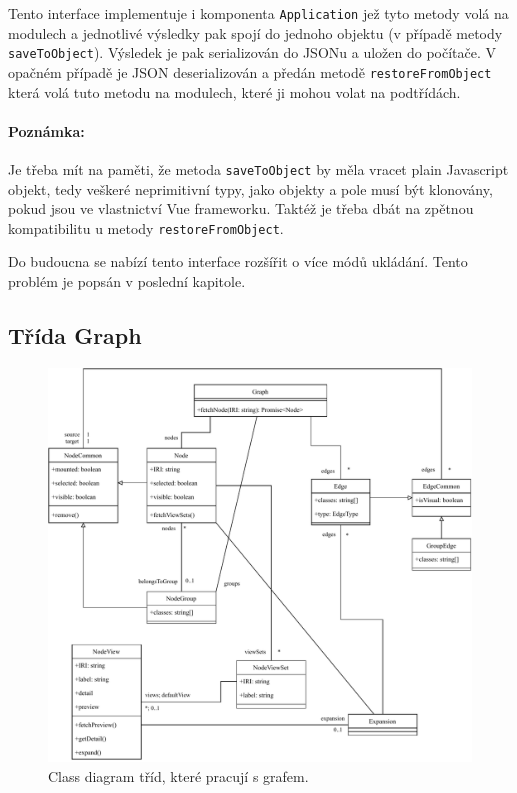 Tento interface implementuje i komponenta \texttt{Application} jež tyto metody volá na modulech a jednotlivé výsledky pak spojí do jednoho objektu (v případě metody \texttt{saveToObject}). Výsledek je pak serializován do JSONu a uložen do počítače. V opačném případě je JSON deserializován a předán metodě \texttt{restoreFromObject} která volá tuto metodu na modulech, které ji mohou volat na podtřídách.

\paragraph{Poznámka:} Je třeba mít na paměti, že metoda \texttt{saveToObject} by měla vracet plain Javascript objekt, tedy veškeré neprimitivní typy, jako objekty a pole musí být klonovány, pokud jsou ve vlastnictví Vue frameworku. Taktéž je třeba dbát na zpětnou kompatibilitu u metody \texttt{restoreFromObject}.

\smallskip

Do budoucna se nabízí tento interface rozšířit o více módů ukládání. Tento problém je popsán v poslední kapitole.

\subsection{Třída Graph}

\begin{figure}
    \centering
    \includegraphics[width=\textwidth]{media/graph.pdf}
    \caption{Class diagram tříd, které pracují s grafem.}
\end{figure}

